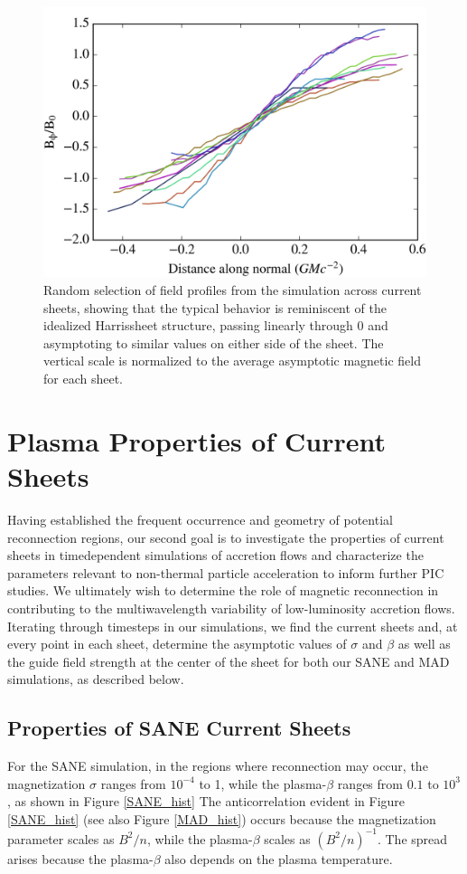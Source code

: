 \begin{figure}[!h]
	\centering
	\includegraphics[width =\textwidth]{paper2_fig4.jpg}
	\caption{Random selection of field profiles from the simulation across current
		sheets, showing that the typical behavior is reminiscent of the idealized Harrissheet structure, passing linearly through 0 and asymptoting to similar values on
		either side of the sheet. The vertical scale is normalized to the average
		asymptotic magnetic field for each sheet.}
	\label{many_fieldprof}
\end{figure}

\section{Plasma Properties of Current Sheets}
Having established the frequent occurrence and geometry of potential reconnection regions, our second goal
is to investigate the properties of current sheets in timedependent simulations of accretion flows and characterize
the parameters relevant to non-thermal particle acceleration to inform further PIC studies. We ultimately wish to
determine the role of magnetic reconnection in contributing to the multiwavelength variability of low-luminosity
accretion flows.
Iterating through timesteps in our simulations, we
find the current sheets and, at every point in each sheet,
determine the asymptotic values of $\sigma$ and $\beta$ as well as
the guide field strength at the center of the sheet for
both our SANE and MAD simulations, as described
below.

\subsection{Properties of SANE Current Sheets}
For the SANE simulation, in the regions where reconnection may occur, the magnetization $\sigma$ ranges from $10^{-4}$ to 1, while the plasma-$\beta$ ranges from $0.1$ to $10^3$, as shown in Figure \ref{SANE_hist}
The anticorrelation evident in Figure \ref{SANE_hist} (see also Figure \ref{MAD_hist}) occurs because the magnetization parameter scales as $B^2/n$, while the plasma-$\beta$ scales as $(B^2/n)^{-1}$.  The spread arises because the plasma-$\beta$ also depends on the plasma temperature.



